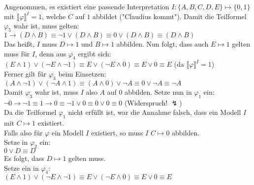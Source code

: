 \documentclass[11pt, a4paper]{article}
\begin{document}
\begin{adjustwidth}{20pt}{20pt}
Angenommen, es existiert eine passende Interpretation $I:\{A,B,C,D,E \}\mapsto \{0,1\}$ mit $\llbracket \varphi \rrbracket^I=1$, welche $C$ auf $1$ abbildet ("Claudius kommt"). Damit die Teilformel $\varphi_5$ wahr ist, muss gelten:\\

$1\rightarrow (D\wedge B) \equiv \neg 1\vee (D\wedge B) \equiv 0 \vee (D\wedge B) \equiv (D\wedge B)$\\

Das heißt, $I$ muss $D\mapsto 1$ und $B\mapsto 1$ abbilden. Nun folgt, dass auch $E\mapsto 1$ gelten muss für $I$, denn aus $\varphi_4$ ergibt sich:\\

$(E\wedge 1)\vee(\neg E\wedge \neg 1) \equiv E\vee(\neg E\wedge 0) \equiv E\vee 0 \equiv E$ \qquad (da $\llbracket \varphi \rrbracket^I=1$)\\

Ferner gilt für $\varphi_3$ beim Einsetzen:\\

$(A\wedge\neg 1)\vee(\neg A \wedge 1) \equiv (A\wedge 0)\vee \neg A  \equiv 0\vee \neg A  \equiv \neg A$\\

Damit $\varphi_3$ wahr ist, muss $I$ also $A$ auf $0$ abbilden. Setze nun in $\varphi_1$ ein:\\

$\neg 0 \rightarrow  \neg 1 \equiv 1 \rightarrow  0 \equiv \neg 1 \vee 0 \equiv 0 \vee 0 \equiv 0$ (Widerspruch! $\lightning$)\\

Da die Teilformel $\varphi_1$ nicht erfüllt ist, war die Annahme falsch, dass ein Modell $I$ mit $C\mapsto 1$ existiert.\\

Falls also für $\varphi$ ein Modell $I$ existiert, so muss $I$ $C\mapsto 0$ abbilden.\\
Setze in $\varphi_2$ ein:\\

$0\vee D \equiv D$\\

Es folgt, dass $D\mapsto 1$ gelten muss.\\
Setze ein in $\varphi_4$:\\

$(E\wedge 1)\vee(\neg E\wedge \neg 1) \equiv E \vee (\neg E\wedge 0) \equiv E\vee 0 \equiv E$\\


\end{adjustwidth}
\end{document}
